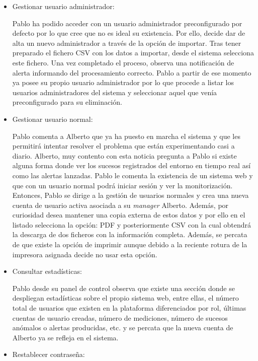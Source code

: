 \documentclass[12pt,a4paper, twoside]{report}
\begin{document}
\begin{itemize}
		\item Gestionar usuario administrador:
		
		Pablo ha podido acceder con un usuario administrador preconfigurado por defecto por lo que cree que no es ideal su existencia. Por ello, decide dar de alta un nuevo administrador a través de la opción de importar. Tras tener preparado el fichero CSV con los datos a importar, desde el sistema selecciona este fichero. Una vez completado el proceso, observa una notificación de alerta informando del procesamiento correcto. Pablo a partir de ese momento ya posee su propio usuario administrador por lo que procede a listar los usuarios administradores del sistema y seleccionar aquel que venía preconfigurado para su eliminación.
					
		\item Gestionar usuario normal:
		
		Pablo comenta a Alberto que ya ha puesto en marcha el sistema y que les permitirá intentar resolver el problema que están experimentando casi a diario. Alberto, muy contento con esta noticia pregunta a Pablo si existe alguna forma donde ver los sucesos registrados del entorno en tiempo real así como las alertas lanzadas. Pablo le comenta la existencia de un sistema web y que con un usuario normal podrá iniciar sesión y ver la monitorización. \\
		
		Entonces, Pablo se dirige a la gestión de usuarios normales y crea una nueva cuenta de usuario activa asociada a su \textit{manager} Alberto. Además, por curiosidad desea mantener una copia externa de estos datos y por ello en el listado selecciona la opción: PDF y posteriormente CSV con la cual obtendrá la descarga de dos ficheros con la información completa. Además, se percata de que existe la opción de imprimir aunque debido a la reciente rotura de la impresora asignada decide no usar esta opción.
		
		\item Consultar estadísticas: %
		
		Pablo desde su panel de control observa que existe una sección donde se despliegan estadísticas sobre el propio sistema web, entre ellas, el número total de usuarios que existen en la plataforma diferenciados por rol, últimas cuentas de usuario creadas, número de mediciones, número de sucesos anómalos o alertas producidas, etc. y se percata que la nueva cuenta de Alberto ya se refleja en el sistema.
		
		\item Restablecer contraseña:
		

\end{itemize}
\end{document}
